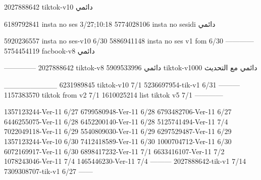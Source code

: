 2027888642 tiktok-v10
دائمي

6189792841 insta no ses
3/27;10:18
5774028106 insta no sesidi
دائمي


5920236557 insta no ses-v10
6/30
5886941148 insta no ses v1 fom
6/30
------------
5754454119 facbook-v8
دائمي


--------------
2027888642 tiktok-v8
دائمي
5909533996 tiktok-v1000
دائمي مع التحديث

__________
6231989845 tiktok-v10
7/1
5236697954-tik-v1
6/31
---------
1157383570 tiktok from v2
7/1
1610025214 list tiktok v5
7/1
------------

1357123244-Ver-11
6/27
6799580948-Ver-11
6/28
6793482706-Ver-11
6/27
6446255075-Ver-11
6/28
6452200140-Ver-11
6/28
5125741494-Ver-11
7/4
7022049118-Ver-11
6/29
5540809030-Ver-11
6/29
6297529487-Ver-11
6/29
1357123244-Ver-10
6/30
7412418589-Ver-11
6/30
1000704712-Ver-11
6/30
6072169917-Ver-11
6/30
6898417232-Ver-11
7/1
6633416107-Ver-11
7/2
1078243046-Ver-11
7/4
1465446230-Ver-11
7/4
---------
2027888642-tik-v1
7/14
7309308707-tik-v1
6/27
------
